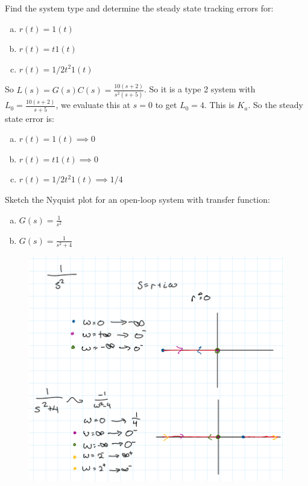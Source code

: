 \documentclass[11pt]{article}
\begin{document}
Find the system type and determine the steady state tracking errors for:

\begin{enumerate}[a)]
    \item $r(t) = 1(t)$
    \item $r(t) = t1(t)$
    \item $r(t) = 1/2 t^2 1(t)$
\end{enumerate}

\soln

So $L(s) = G(s)C(s) = \frac{10(s+2)}{s^2(s+5)}$. So it is a type 2 system with $L_0 = \frac{10(s+2)}{s+5}$,
we evaluate this at $s = 0$ to get $L_0 = 4$. This is $K_a$. So the steady state error is:

\begin{enumerate}[a)]
    \item $r(t) = 1(t) \implies 0$
    \item $r(t) = t1(t) \implies 0$
    \item $r(t) = 1/2 t^2 1(t) \implies 1/4$
\end{enumerate}


Sketch the Nyquist plot for an open-loop system with transfer function:
\begin{enumerate}[a)]
    \item $G(s) = \frac{1}{s^2}$
    \item $G(s) = \frac{1}{s^2 + 4}$
\end{enumerate}

\soln

\begin{figure}[h] 
    \centering
    \includegraphics[width=0.55 \linewidth]{11-20-p7.png}
    \caption{}
    \label{fig:}
\end{figure}
\end{document}
